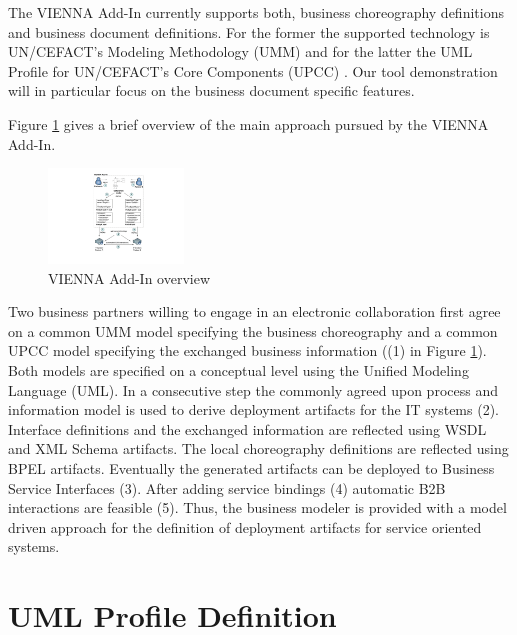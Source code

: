 \documentclass{acm_proc_article-sp}
\begin{document}
The VIENNA Add-In currently supports both, business choreography definitions and business document definitions. For the former the supported technology is UN/CEFACT's Modeling Methodology (UMM) \cite{man:umm2} and for the latter the UML Profile for UN/CEFACT's Core Components (UPCC) \cite{man:upcc}. Our tool demonstration will in particular focus on the business document specific features. 

Figure \ref{fig:viennaaddinoverview} gives a brief overview of the main approach pursued by the VIENNA Add-In. 
\begin{figure}
 \centering
   \includegraphics[width=0.32\textwidth]{figures/addinoverview.pdf}
 \caption{VIENNA Add-In overview}
 \label{fig:viennaaddinoverview}
\end{figure}
Two business partners willing to engage in an electronic collaboration first agree on a common UMM model specifying the business choreography and a common UPCC model specifying the exchanged business information ((1) in Figure \ref{fig:viennaaddinoverview}). Both models are specified on a conceptual level using the Unified Modeling Language (UML). In a consecutive step the commonly agreed upon process and information model is used to derive deployment artifacts for the IT systems (2). Interface definitions and the exchanged information are reflected using WSDL and XML Schema artifacts. The local choreography definitions are reflected using BPEL artifacts. Eventually the generated artifacts can be deployed to Business Service Interfaces (3). After adding service bindings (4) automatic B2B interactions are feasible (5). Thus, the business modeler is provided with a model driven approach for the definition of deployment artifacts for service oriented systems.


\section{UML Profile Definition}
\end{document}
